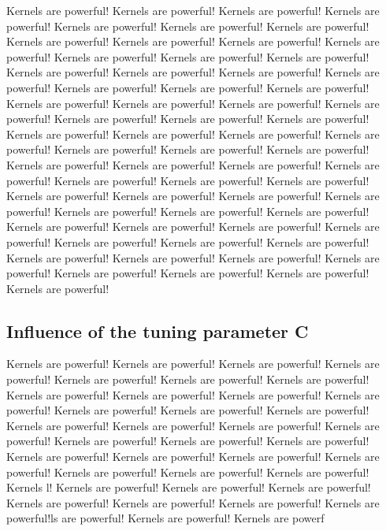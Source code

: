 \documentclass[letterpaper]{article}
\begin{document}
 Kernels are powerful! Kernels are powerful! Kernels are powerful! Kernels are powerful! Kernels are powerful! Kernels are powerful! Kernels are powerful! Kernels are powerful! Kernels are powerful! Kernels are powerful! Kernels are powerful! Kernels are powerful! Kernels are powerful! Kernels are powerful! Kernels are powerful! Kernels are powerful! Kernels are powerful! Kernels are powerful! Kernels are powerful! Kernels are powerful! Kernels are powerful! Kernels are powerful! Kernels are powerful! Kernels are powerful! Kernels are powerful! Kernels are powerful! Kernels are powerful! Kernels are powerful! Kernels are powerful! Kernels are powerful! Kernels are powerful! Kernels are powerful! Kernels are powerful! Kernels are powerful! Kernels are powerful! Kernels are powerful! Kernels are powerful! Kernels are powerful! Kernels are powerful! Kernels are powerful! Kernels are powerful! Kernels are powerful! Kernels are powerful! Kernels are powerful! Kernels are powerful! Kernels are powerful! Kernels are powerful! Kernels are powerful! Kernels are powerful! Kernels are powerful! Kernels are powerful! Kernels are powerful! Kernels are powerful! Kernels are powerful! Kernels are powerful! Kernels are powerful! Kernels are powerful! Kernels are powerful! Kernels are powerful! Kernels are powerful! Kernels are powerful! Kernels are powerful! Kernels are powerful! Kernels are powerful! 

\subsection{Influence of the tuning parameter C}

 Kernels are powerful! Kernels are powerful! Kernels are powerful! Kernels are powerful! Kernels are powerful! Kernels are powerful! Kernels are powerful! Kernels are powerful! Kernels are powerful! Kernels are powerful! Kernels are powerful! Kernels are powerful! Kernels are powerful! Kernels are powerful! Kernels are powerful! Kernels are powerful! Kernels are powerful! Kernels are powerful! Kernels are powerful! Kernels are powerful! Kernels are powerful! Kernels are powerful! Kernels are powerful! Kernels are powerful! Kernels are powerful! Kernels are powerful! Kernels are powerful! Kernels are powerful! Kernels l\cite{Einstein}! Kernels are powerful\cite{Einstein}! Kernels are powerful\cite{Einstein}! Kernels are powerful\cite{Einstein}! Kernels are powerful\cite{Einstein}! Kernels are powerful\cite{Einstein}! Kernels are powerful\cite{Einstein}! Kernels are powerful\cite{Einstein}!ls are powerful\cite{Einstein}! Kernels are powerful\cite{Einstein}! Kernels are powerf
\end{document}
